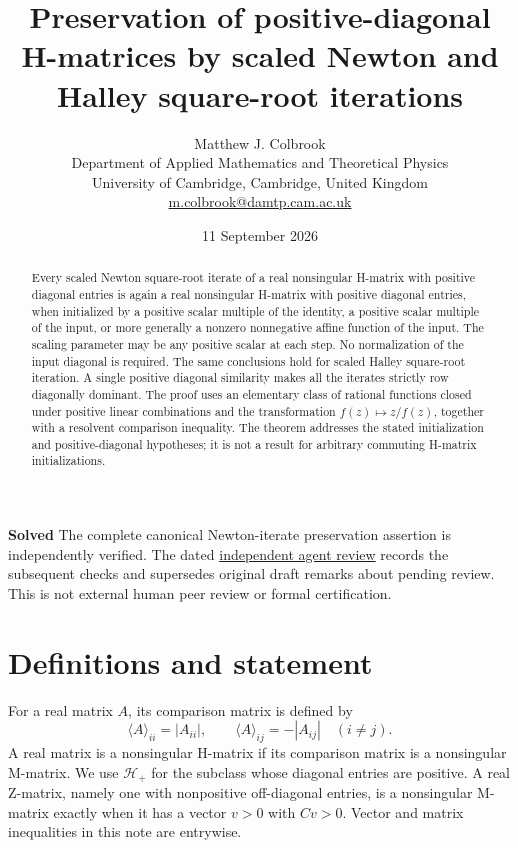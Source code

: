 \documentclass[11pt]{article}
\title{Preservation of positive-diagonal H-matrices by scaled Newton and Halley square-root iterations}
\author{Matthew J. Colbrook\\\small Department of Applied Mathematics and Theoretical Physics\\\small University of Cambridge, Cambridge, United Kingdom\\\small\href{mailto:m.colbrook@damtp.cam.ac.uk}{m.colbrook@damtp.cam.ac.uk}}
\date{11 September 2026}
\newcommand{\comp}[1]{\langle #1\rangle}
\begin{document}
\maketitle

\noindent\textbf{Solved} The complete canonical Newton-iterate preservation assertion is independently verified.
The dated \href{https://github.com/MColbrook/OpenProblemsInNLA/blob/codex/colbrook-matrix-function-resolutions/references/colbrook-matrix-functions-2026-09-11/verification/reviews/SF-01-review.md}{independent agent review} records the subsequent checks and supersedes original draft remarks about pending review. This is not external human peer review or formal certification.
\par\medskip

\begin{abstract}
Every scaled Newton square-root iterate of a real nonsingular H-matrix with positive diagonal entries is again a real nonsingular H-matrix with positive diagonal entries, when initialized by a positive scalar multiple of the identity, a positive scalar multiple of the input, or more generally a nonzero nonnegative affine function of the input. The scaling parameter may be any positive scalar at each step. No normalization of the input diagonal is required. The same conclusions hold for scaled Halley square-root iteration. A single positive diagonal similarity makes all the iterates strictly row diagonally dominant. The proof uses an elementary class of rational functions closed under positive linear combinations and the transformation $f(z)\mapsto z/f(z)$, together with a resolvent comparison inequality. The theorem addresses the stated initialization and positive-diagonal hypotheses; it is not a result for arbitrary commuting H-matrix initializations.
\end{abstract}

\section{Definitions and statement}
For a real matrix $A$, its comparison matrix is defined by
\[
\comp A_{ii}=|A_{ii}|,\qquad \comp A_{ij}=-|A_{ij}|\quad(i\ne j).
\]
A real matrix is a nonsingular H-matrix if its comparison matrix is a nonsingular M-matrix. We use $\mathcal H_+$ for the subclass whose diagonal entries are positive. A real Z-matrix, namely one with nonpositive off-diagonal entries, is a nonsingular M-matrix exactly when it has a vector $v>0$ with $Cv>0$. Vector and matrix inequalities in this note are entrywise.
\end{document}
